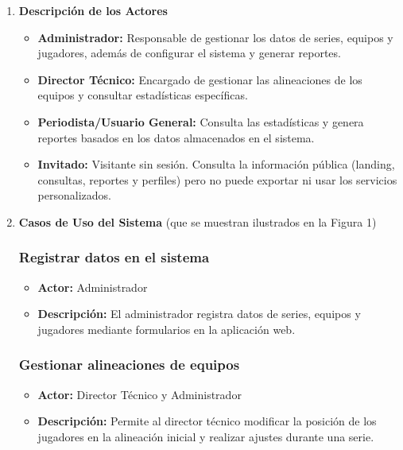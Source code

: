 \documentclass{report}
\begin{document}
        \begin{enumerate}
        \item \textbf{Descripción de los Actores}

            \begin{itemize}
                \item \textbf{Administrador:} Responsable de gestionar los datos de series, equipos y jugadores, 
                además de configurar el sistema y generar reportes.
                \item \textbf{Director Técnico:} Encargado de gestionar las alineaciones de los equipos y consultar 
                estadísticas específicas.
                \item \textbf{Periodista/Usuario General:} Consulta las estadísticas y genera reportes basados en 
                los datos almacenados en el sistema.
                \item \textbf{Invitado:} Visitante sin sesión. Consulta la información pública (landing, consultas,
                reportes y perfiles) pero no puede exportar ni usar los servicios personalizados.
            \end{itemize}

        \item \textbf{Casos de Uso del Sistema} (que se muestran ilustrados en la Figura 1)
            
            \subsubsection{Registrar datos en el sistema}
            \begin{itemize}
                \item \textbf{Actor:} Administrador
                \item \textbf{Descripción:} El administrador registra datos de series, equipos y jugadores mediante 
                formularios en la aplicación web.
            \end{itemize}

            \subsubsection{Gestionar alineaciones de equipos}
            \begin{itemize}
                \item \textbf{Actor:} Director Técnico y Administrador
                \item \textbf{Descripción:} Permite al director técnico modificar la posición de los jugadores en 
                la alineación inicial y realizar ajustes durante una serie.
            \end{itemize}


\end{enumerate}
\end{document}
